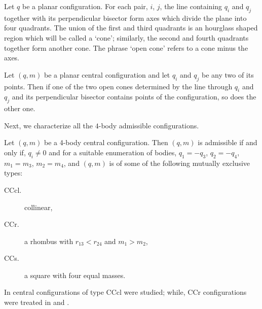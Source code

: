 \documentclass[smallcondensed]{svjour3}
\begin{document}
\begin{definition}\label{def:bis.per}
Let $q$ be a planar configuration. For each pair, $i$, $j$, the line
containing $q_i$ and $q_j$ together with its perpendicular bisector form axes which
divide the plane into four quadrants. The union of the first and third quadrants
is an hourglass shaped region which will be called a `cone'; similarly,
the second and fourth quadrants together form another cone. The phrase `open
cone' refers to a cone minus the axes.
\end{definition}

\begin{theorem}\label{thm:bisector.moeckel}
Let $(q,m)$ be a planar central configuration and let
$q_i$ and $q_j$ be any two of its points. Then if one of the two open cones determined
by the line through $q_i$ and $q_j$ and its perpendicular bisector contains points of
the configuration, so does the other one.
\end{theorem}

Next, we characterize all the $4$-body admissible  configurations.

\begin{theorem}\label{thm:caracterizacion4}
Let $(q,m)$ be a 4-body central configuration. Then $(q,m)$ is  admissible if and only if, $q_i\neq 0$ and  for a suitable enumeration  of bodies,   $q_1=-q_3$, $q_2=-q_4$, $m_1=m_3$,  $m_2=m_4$, and  $(q,m)$ is of some of the following mutually exclusive types:
\begin{description}
\item[CCcl.]   collinear,
\item[CCr.]  a rhombus with $r_{13}<r_{24}$ and $m_1>m_2$,
\item[CCs.]  a square with four equal masses.
\end{description}
\end{theorem}




\begin{remark} In \cite{shoaib2011collinear}  central configurations of type CCcl were studied; while,  CCr configurations were treated in \cite{long2002four} and \cite{perez2007convex}.

\end{remark}
\end{document}
